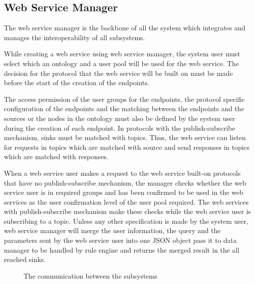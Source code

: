 \subsection{Web Service Manager}

The web service manager is the backbone of all the system which integrates and manages the interoperability of all subsystems.  

While creating a web service using web service manager, the system user must select which an ontology and a user pool will be used for the web service. The decision for the protocol that the web service will be built on must be made before the start of the creation of the endpoints. 

The access permission of the user groups for the endpoints, the protocol specific configuration of the endpoints and the matching between the endpoints and the sources or the nodes in the ontology must also be defined by the system user during the creation of each endpoint. In protocols with the publish-subscribe mechanism, sinks must be matched with topics. Thus, the web service can listen for requests in topics which are matched with source and send responses in topics which are matched with responses.

When a web service user makes a request to the web service built-on protocols that have no publish-subscribe mechanism, the manager checks whether the web service user is in required groups and has been confirmed to be used in the web services as the user confirmation level of the user pool required. The web services with publish-subscribe mechanism make these checks while the web service user is subscribing to a topic. Unless any other specification is made by the system user, web service manager will merge the user information, the query and the parameters sent by the web service user into one JSON object pass it to data manager to be handled by rule engine and returns the merged result in the all reached sinks. 

\begin{figure}[htpb]
  \centering
  \caption[Subsystem Architecture]{The communication between the subsystems}\label{fig:subsystems}
\end{figure}